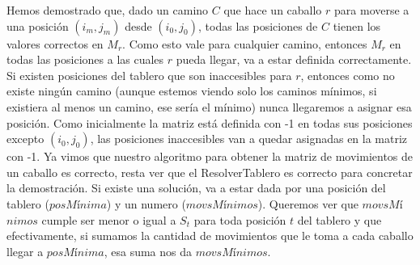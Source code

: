 \documentclass[a4paper]{article}
\begin{document}
\newline Hemos demostrado que, dado un camino $C$ que hace un caballo $r$ para moverse a una posición $(i_m, j_m)$ desde $(i_0, j_0)$, todas las posiciones de $C$ tienen los valores correctos en $M_r$. Como esto vale para cualquier camino, entonces $M_r$ en todas las posiciones a las cuales $r$ pueda llegar, va a estar definida correctamente.
\newline Si existen posiciones del tablero que son inaccesibles para $r$, entonces como no existe ningún camino (aunque estemos viendo solo los caminos mínimos, si existiera al menos un camino, ese sería el mínimo) nunca llegaremos a asignar esa posición. Como inicialmente la matriz está definida con -1 en todas sus posiciones excepto $(i_0, j_0)$, las posiciones inaccesibles van a quedar asignadas en la matriz con -1.
\newline 
\newline Ya vimos que nuestro algoritmo para obtener la matriz de movimientos de un caballo es correcto, resta ver que el ResolverTablero es correcto para concretar la demostración.
\newline Si existe una solución, va a estar dada por una posición del tablero ($posM$í$nima$) y un numero ($movsM$í$nimos$). Queremos ver que $movsM$í$nimos$ cumple ser menor o igual a $S_t$ para toda posición $t$ del tablero y que efectivamente, si sumamos la cantidad de movimientos que le toma a cada caballo llegar a $posM$í$nima$, esa suma nos da $movsM$í$nimos$. 
\end{document}
